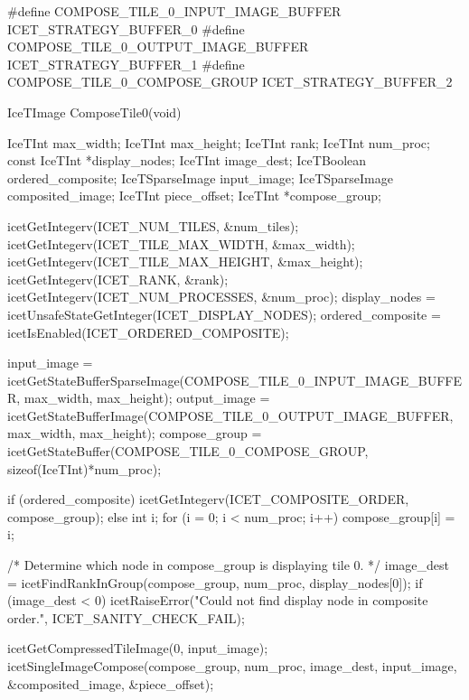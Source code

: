 \begin{code}
#define COMPOSE_TILE_0_INPUT_IMAGE_BUFFER       ICET_STRATEGY_BUFFER_0
#define COMPOSE_TILE_0_OUTPUT_IMAGE_BUFFER      ICET_STRATEGY_BUFFER_1
#define COMPOSE_TILE_0_COMPOSE_GROUP            ICET_STRATEGY_BUFFER_2

IceTImage ComposeTile0(void)
{
  IceTInt max_width;
  IceTInt max_height;
  IceTInt rank;
  IceTInt num_proc;
  const IceTInt *display_nodes;
  IceTInt image_dest;
  IceTBoolean ordered_composite;
  IceTSparseImage input_image;
  IceTSparseImage composited_image;
  IceTInt piece_offset;
  IceTInt *compose_group;

  icetGetIntegerv(ICET_NUM_TILES, &num_tiles);
  icetGetIntegerv(ICET_TILE_MAX_WIDTH, &max_width);
  icetGetIntegerv(ICET_TILE_MAX_HEIGHT, &max_height);
  icetGetIntegerv(ICET_RANK, &rank);
  icetGetIntegerv(ICET_NUM_PROCESSES, &num_proc);
  display_nodes = icetUnsafeStateGetInteger(ICET_DISPLAY_NODES);
  ordered_composite = icetIsEnabled(ICET_ORDERED_COMPOSITE);

  input_image = icetGetStateBufferSparseImage(COMPOSE_TILE_0_INPUT_IMAGE_BUFFER,
                                              max_width, max_height);
  output_image = icetGetStateBufferImage(COMPOSE_TILE_0_OUTPUT_IMAGE_BUFFER,
                                         max_width, max_height);
  compose_group = icetGetStateBuffer(COMPOSE_TILE_0_COMPOSE_GROUP,
                                     sizeof(IceTInt)*num_proc);

  if (ordered_composite) {
    icetGetIntegerv(ICET_COMPOSITE_ORDER, compose_group);
  } else {
    int i;
    for (i = 0; i < num_proc; i++) {
      compose_group[i] = i;
    }
  }

  /* Determine which node in compose_group is displaying tile 0. */
  image_dest = icetFindRankInGroup(compose_group, num_proc, display_nodes[0]);
  if (image_dest < 0) {
    icetRaiseError("Could not find display node in composite order.",
                   ICET_SANITY_CHECK_FAIL);
  }

  icetGetCompressedTileImage(0, input_image);
  icetSingleImageCompose(compose_group,
                         num_proc,
                         image_dest,
                         input_image,
                         &composited_image,
                         &piece_offset);

}
\end{code}
